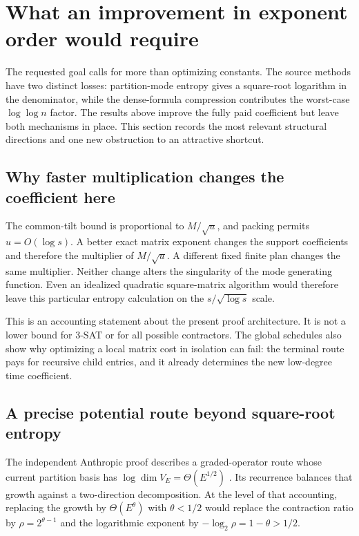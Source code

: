 \section{What an improvement in exponent order would require}\label{sec:order}

The requested goal calls for more than optimizing constants. The source
methods have two distinct losses: partition-mode entropy gives a
square-root logarithm in the denominator, while the dense-formula
compression contributes the worst-case $\log\log n$ factor. The
results above improve the fully paid coefficient but leave both
mechanisms in place. This section records the most relevant structural
directions and one new obstruction to an attractive shortcut.

\subsection{Why faster multiplication changes the coefficient here}

The common-tilt bound is proportional to $M/\sqrt u$, and packing permits
$u=O(\log s)$. A better exact matrix exponent changes the support
coefficients and therefore the multiplier of $M/\sqrt u$. A different
fixed finite plan changes the same multiplier. Neither change alters
the singularity of the mode generating function. Even an idealized
quadratic square-matrix algorithm would therefore leave this particular
entropy calculation on the $s/\sqrt{\log s}$ scale.

This is an accounting statement about the present proof architecture.
It is not a lower bound for 3-SAT or for all possible contractors.
The global schedules also show why optimizing a local matrix cost in
isolation can fail: the terminal route pays for recursive child entries,
and it already determines the new low-degree time coefficient.

\subsection{A precise potential route beyond square-root entropy}

The independent Anthropic proof describes a graded-operator route whose
current partition basis has
$\log\dim V_E=\Theta(E^{1/2})$ \cite{anthropicpaper}. Its recurrence
balances that growth against a two-direction decomposition. At the level
of that accounting, replacing the growth by
$\Theta(E^\theta)$ with $\theta<1/2$ would replace the contraction
ratio by $\rho=2^{\theta-1}$ and the logarithmic exponent by
$-\log_2\rho=1-\theta>1/2$.

